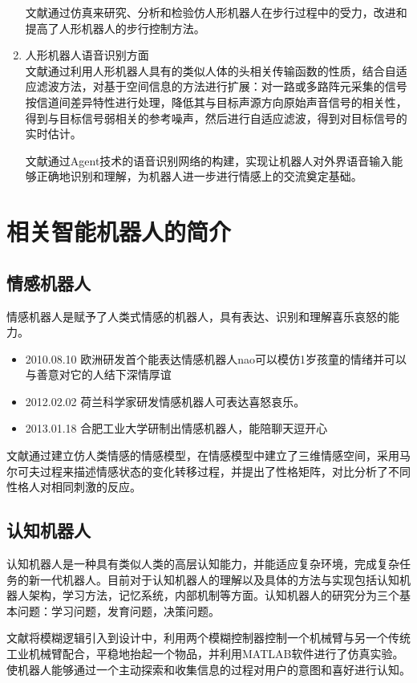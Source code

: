 \documentclass[10pt,a4paper]{article}
\begin{document}
\begin{CJK*}{UTF8}{gkai}
\begin{enumerate}
文献\cite{4}通过仿真来研究、分析和检验仿人形机器人在步行过程中的受力，改进和提高了人形机器人的步行控制方法。
\item 人形机器人语音识别方面\\
文献\cite{5}通过利用人形机器人具有的类似人体的头相关传输函数的性质，结合自适应滤波方法，对基于空间信息的方法进行扩展：对一路或多路阵元采集的信号按信道间差异特性进行处理，降低其与目标声源方向原始声音信号的相关性，得到与目标信号弱相关的参考噪声，然后进行自适应滤波，得到对目标信号的实时估计。

文献\cite{6}通过Agent技术的语音识别网络的构建，实现让机器人对外界语音输入能够正确地识别和理解，为机器人进一步进行情感上的交流奠定基础。
\end{enumerate}


\section{相关智能机器人的简介}
\subsection{情感机器人}
情感机器人是赋予了人类式情感的机器人，具有表达、识别和理解喜乐哀怒的能力。
\begin{itemize}
\item 2010.08.10 欧洲研发首个能表达情感机器人nao可以模仿1岁孩童的情绪并可以与善意对它的人结下深情厚谊
\item 2012.02.02 荷兰科学家研发情感机器人可表达喜怒哀乐。
\item 2013.01.18 合肥工业大学研制出情感机器人，能陪聊天逗开心
\end{itemize}
文献\cite{7}通过建立仿人类情感的情感模型，在情感模型中建立了三维情感空间，采用马尔可夫过程来描述情感状态的变化转移过程，并提出了性格矩阵，对比分析了不同性格人对相同刺激的反应。

\subsection{认知机器人}
认知机器人是一种具有类似人类的高层认知能力，并能适应复杂环境，完成复杂任务的新一代机器人。目前对于认知机器人的理解以及具体的方法与实现包括认知机器人架构，学习方法，记忆系统，内部机制等方面。认知机器人的研究分为三个基本问题：学习问题，发育问题，决策问题。


文献\cite{8}将模糊逻辑引入到设计中，利用两个模糊控制器控制一个机械臂与另一个传统工业机械臂配合，平稳地抬起一个物品，并利用MATLAB软件进行了仿真实验。使机器人能够通过一个主动探索和收集信息的过程对用户的意图和喜好进行认知。


\end{CJK*}
\end{document}
